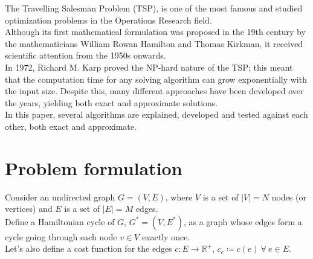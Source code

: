The Travelling Salesman Problem (TSP), is one of the most famous and studied optimization problems in the Operations Research field.\\
Although its first mathematical formulation was proposed in the 19th century by the mathematicians William Rowan Hamilton and Thomas Kirkman, it received scientific attention from the 1950s onwards.\\
In 1972, Richard M. Karp proved the NP-hard nature of the TSP; this meant that the computation time for any solving algorithm can grow exponentially with the input size. Despite this, many different approaches have been developed over the years, yielding both exact and approximate solutions.\\

In this paper, several algorithms are explained, developed and tested against each other, both exact and approximate.

\section{Problem formulation}

Consider an undirected graph $G=(V, E)$, where $V$ is a set of $|V|=N$ nodes (or vertices) and $E$ is a set of $|E|=M$ edges.\\
Define a Hamiltonian cycle of $G$, $G^*=(V, E^*)$, as a graph whose edges form a cycle going through each node $v\in V$ exactly once.\\
Let's also define a cost function for the edges $c : E \rightarrow \mathbb{R}^+$, $c_e\coloneq c(e) \ \forall \ e\in E$.\\

